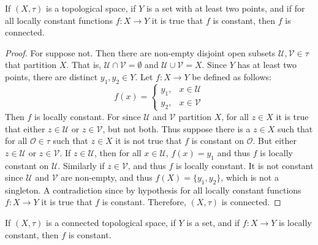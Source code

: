 \documentclass[oneside]{book}                                                  %
\begin{document}
            \begin{theorem}
                If $(X,\tau)$ is a topological space, if $Y$ is a set with at
                least two points, and if for all locally constant functions
                $f:X\rightarrow{Y}$ it is true that $f$ is constant, then
                $f$ is connected.
            \end{theorem}
            \begin{proof}
                For suppose not. Then there are non-empty disjoint open subsets
                $\mathcal{U},\mathcal{V}\in\tau$ that partition $X$. That is,
                $\mathcal{U}\cap\mathcal{V}=\emptyset$ and
                $\mathcal{U}\cup\mathcal{V}=X$. Since $Y$ has at least two
                points, there are distinct $y_{1},y_{2}\in{Y}$. Let
                $f:X\rightarrow{Y}$ be defined as follows:
                \begin{equation}
                    f(x)=
                    \begin{cases}
                        y_{1},&x\in\mathcal{U}\\
                        y_{2},&x\in\mathcal{V}
                    \end{cases}
                \end{equation}
                Then $f$ is locally constant. For since $\mathcal{U}$ and
                $\mathcal{V}$ partition $X$, for all $z\in{X}$ it is true that
                either $z\in\mathcal{U}$ or $z\in\mathcal{V}$, but not both.
                Thus suppose there is a $z\in{X}$ such that for all
                $\mathcal{O}\in\tau$ such that $z\in{X}$ it is not true that
                $f$ is constant on $\mathcal{O}$. But either $z\in\mathcal{U}$
                or $z\in\mathcal{V}$. If $z\in\mathcal{U}$, then for all
                $x\in\mathcal{U}$, $f(x)=y_{1}$ and thus $f$ is locally
                constant on $\mathcal{U}$. Similarly if $z\in\mathcal{V}$, and
                thus $f$ is locally constant. It is not constant since
                $\mathcal{U}$ and $\mathcal{V}$ are non-empty, and thus
                $f(X)=\{y_{1},y_{2}\}$, which is not a singleton. A
                contradiction since by hypothesis for all locally constant
                functions $f:X\rightarrow{Y}$ it is true that $f$ is constant.
                Therefore, $(X,\tau)$ is connected.
            \end{proof}
            \begin{theorem}
                If $(X,\tau)$ is a connected topological space, if $Y$ is a set,
                and if $f:X\rightarrow{Y}$ is locally constant, then $f$ is
                constant.
            \end{theorem}
\end{document}
